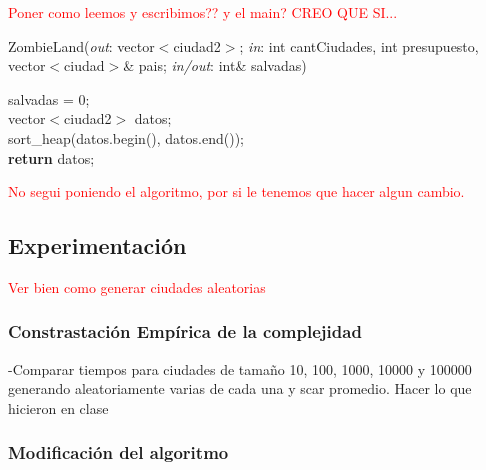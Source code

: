 \documentclass[a4paper]{article}
\begin{document}
\textcolor{red}{Poner como leemos y escribimos?? y el main? CREO QUE SI...}


\begin{algorithm}[h!]
\caption{ZombieLand(\textit{out}: vector$<$ciudad2$>$; \textit{in}: int cantCiudades, int presupuesto, vector$<$ciudad$>$\& pais; \textit{in/out}:  int\& salvadas)}
salvadas = 0;\\
vector$<$ciudad2$>$ datos;\\
sort_heap(datos.begin(), datos.end());\\
\textbf{return} datos;
\end{algorithm}

\textcolor{red}{No segui poniendo el algoritmo, por si le tenemos que hacer algun cambio.}

\newpage
\subsection{Experimentaci\'on}

\textcolor{red}{Ver bien como generar ciudades aleatorias}
\subsubsection{Constrastaci\'on Emp\'irica de la complejidad}
-Comparar tiempos para ciudades de tama\~no 10, 100, 1000, 10000 y 100000 generando aleatoriamente varias de cada una y scar promedio. Hacer lo que hicieron en clase\\


\newpage
\subsubsection{Modificaci\'on del algoritmo}
\end{document}
